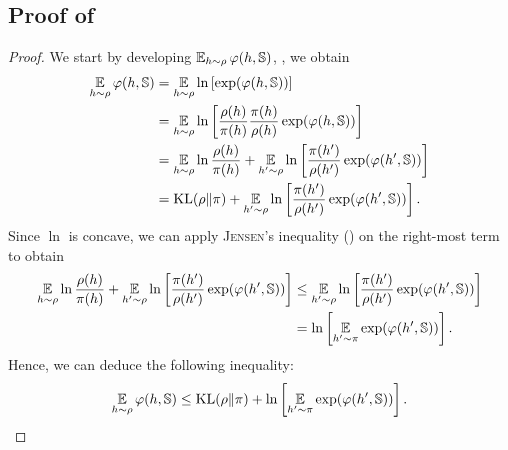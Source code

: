 \begin{noaddcontents}
\section{Proof of }
\label{ap:pac-bayes:sec:proof-general-germain}

\generalgermain*
\begin{proof}
We start by developing $\operatorname*{\mathbb{E}}_{h\sim\rho}\varphi(h, \mathbb{S})$, \ie, we obtain
\begingroup
\allowdisplaybreaks
\begin{align*}
    \operatorname*{\mathbb{E}}_{h\sim\rho}\varphi(h, \mathbb{S}) &= \operatorname*{\mathbb{E}}_{h\sim\rho}\ln\left[\exp(\varphi(h, \mathbb{S}))\right]\\
    &= \operatorname*{\mathbb{E}}_{h\sim\rho}\ln\left[\frac{\rho(h)}{\pi(h)}\frac{\pi(h)}{\rho(h)}\exp(\varphi(h, \mathbb{S}))\right]\\
    &= \operatorname*{\mathbb{E}}_{h\sim\rho}\ln\frac{\rho(h)}{\pi(h)}+\operatorname*{\mathbb{E}}_{h'\sim\rho}\ln\left[\frac{\pi(h')}{\rho(h')}\exp(\varphi(h', \mathbb{S}))\right]\\
    &= \operatorname{KL}(\rho\|\pi) + \operatorname*{\mathbb{E}}_{h'\sim\rho}\ln\left[\frac{\pi(h')}{\rho(h')}\exp(\varphi(h', \mathbb{S}))\right].
\end{align*}
\endgroup
Since $\ln$ is concave, we can apply \textsc{Jensen}'s inequality  () on the right-most term to obtain
\begin{align*}
    \operatorname*{\mathbb{E}}_{h\sim\rho}\ln\frac{\rho(h)}{\pi(h)}+\operatorname*{\mathbb{E}}_{h'\sim\rho}\ln\left[\frac{\pi(h')}{\rho(h')}\exp(\varphi(h', \mathbb{S}))\right] &\le \operatorname*{\mathbb{E}}_{h'\sim\rho}\ln\left[\frac{\pi(h')}{\rho(h')}\exp(\varphi(h', \mathbb{S}))\right]\\
    &= \ln\left[\operatorname*{\mathbb{E}}_{h'\sim\pi}\exp(\varphi(h', \mathbb{S}))\right].
\end{align*}
Hence, we can deduce the following inequality:
\begin{align}
    \operatorname*{\mathbb{E}}_{h\sim\rho}\varphi(h, \mathbb{S}) \le \operatorname{KL}(\rho\|\pi) + \ln\left[\operatorname*{\mathbb{E}}_{h'\sim\pi}\exp(\varphi(h', \mathbb{S}))\right].\label{chap:pac-bayes:eq:proof-general-germain-1}
\end{align}


\end{proof}
\end{noaddcontents}
